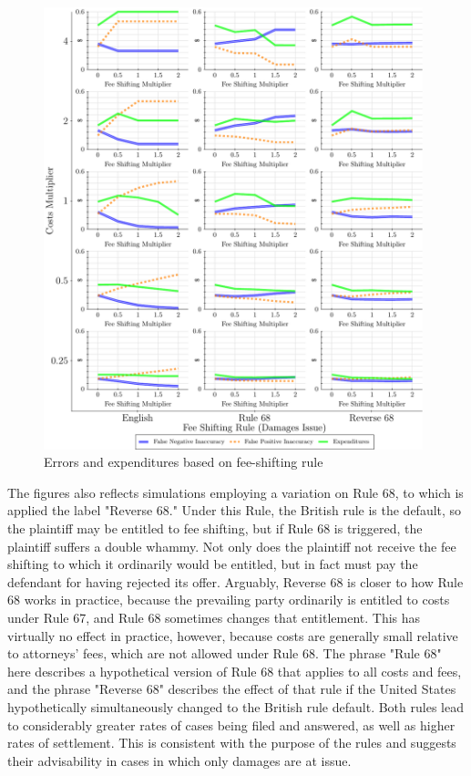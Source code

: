 \documentclass{article}
\begin{document}
\begin{figure}
\begin{minipage}{0.48\textwidth}
        \includegraphics[width=0.98\textwidth, scale=0.70, trim={0in 0in 0in 0in}, clip]{../Figures/Accuracy and Expenditures Varying Fee Shifting Rule (Damages Issue)} %
        \caption{Errors and expenditures based on fee-shifting rule}
		\label{fig:accexp_damagesrule}
    \end{minipage}
\end{figure}

The figures also reflects simulations employing a variation on Rule 68, to which is applied the label "Reverse 68." Under this Rule, the British rule is the default, so the plaintiff may be entitled to fee shifting, but if Rule 68 is triggered, the plaintiff suffers a double whammy. Not only does the plaintiff not receive the fee shifting to which it ordinarily would be entitled, but in fact must pay the defendant for having rejected its offer. Arguably, Reverse 68 is closer to how Rule 68 works in practice, because the prevailing party ordinarily is entitled to costs under Rule 67, and Rule 68 sometimes changes that entitlement. This has virtually no effect in practice, however, because costs are generally small relative to attorneys' fees, which are not allowed under Rule 68. The phrase "Rule 68" here describes a hypothetical version of Rule 68 that applies to all costs and fees, and the phrase "Reverse 68" describes the effect of that rule if the United States hypothetically simultaneously changed to the British rule default. Both rules lead to considerably greater rates of cases being filed and answered, as well as higher rates of settlement. This is consistent with the purpose of the rules and suggests their advisability in cases in which only damages are at issue.
\end{document}
